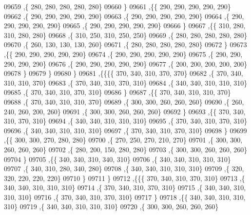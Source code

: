 \begin{DoxyCode}
09659     ,\{   280,   280,   280,   280,   280\}
09660     \}
09661    ,\{\{   290,   290,   290,   290,   290\}
09662     ,\{   290,   290,   290,   290,   290\}
09663     ,\{   290,   290,   290,   290,   290\}
09664     ,\{   290,   290,   290,   290,   290\}
09665     ,\{   290,   290,   290,   290,   290\}
09666     \}
09667    ,\{\{   310,   280,   310,   280,   280\}
09668     ,\{   310,   250,   310,   250,   250\}
09669     ,\{   280,   280,   280,   280,   280\}
09670     ,\{   260,   130,   130,   130,   260\}
09671     ,\{   280,   280,   280,   280,   280\}
09672     \}
09673    ,\{\{   290,   290,   290,   290,   290\}
09674     ,\{   290,   290,   290,   290,   290\}
09675     ,\{   290,   290,   290,   290,   290\}
09676     ,\{   290,   290,   290,   290,   290\}
09677     ,\{   200,   200,   200,   200,   200\}
09678     \}
09679    \}
09680   \}
09681  ,\{\{\{\{   370,   340,   310,   370,   370\}
09682     ,\{   370,   340,   310,   310,   370\}
09683     ,\{   370,   340,   310,   370,   310\}
09684     ,\{   340,   340,   310,   310,   310\}
09685     ,\{   370,   340,   310,   370,   310\}
09686     \}
09687    ,\{\{   370,   340,   310,   310,   370\}
09688     ,\{   370,   340,   310,   310,   370\}
09689     ,\{   300,   300,   260,   260,   260\}
09690     ,\{   260,   240,   260,   200,   260\}
09691     ,\{   300,   300,   260,   260,   260\}
09692     \}
09693    ,\{\{   370,   340,   310,   370,   310\}
09694     ,\{   340,   340,   310,   310,   310\}
09695     ,\{   370,   340,   310,   370,   310\}
09696     ,\{   340,   340,   310,   310,   310\}
09697     ,\{   370,   340,   310,   370,   310\}
09698     \}
09699    ,\{\{   300,   300,   270,   280,   280\}
09700     ,\{   270,   250,   270,   210,   270\}
09701     ,\{   300,   300,   260,   260,   260\}
09702     ,\{   280,   200,   150,   280,   280\}
09703     ,\{   300,   300,   260,   260,   260\}
09704     \}
09705    ,\{\{   340,   340,   310,   340,   310\}
09706     ,\{   340,   340,   310,   310,   310\}
09707     ,\{   340,   310,   280,   340,   280\}
09708     ,\{   340,   340,   310,   310,   310\}
09709     ,\{   320,   320,   220,   220,   220\}
09710     \}
09711    \}
09712   ,\{\{\{   370,   340,   310,   370,   310\}
09713     ,\{   340,   340,   310,   310,   310\}
09714     ,\{   370,   340,   310,   370,   310\}
09715     ,\{   340,   340,   310,   310,   310\}
09716     ,\{   370,   340,   310,   370,   310\}
09717     \}
09718    ,\{\{   340,   340,   310,   310,   310\}
09719     ,\{   340,   340,   310,   310,   310\}
09720     ,\{   300,   300,   260,   260,   260\}

\end{DoxyCode}
